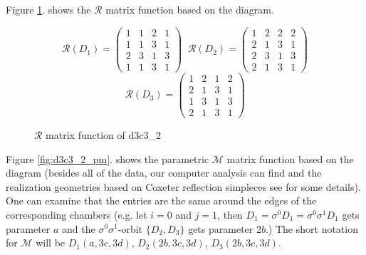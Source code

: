 \documentclass[12pt,a4paper]{article}
\numberwithin{equation}{section}
\theoremstyle{plain}%
\theoremstyle{definition}
\theoremstyle{remark}
\begin{document}
Figure \ref{fig:d3c3_2_r}. shows the $\mathcal{R}$ matrix function based on the
diagram.%

\begin{figure}
  \caption{\label{fig:d3c3_2_r} $\mathcal{R}$ matrix function of d3c3\_2}
  \begin{equation*}
    \mathcal{R}(D_1)=
    \left(
    \begin{array}{cccc}
      1 & 1 & 2 & 1\\
      1 & 1 & 3 & 1\\
      2 & 3 & 1 & 3\\
      1 & 1 & 3 & 1
    \end{array}
    \right)\;\;
    \mathcal{R}(D_2)=
    \left(
    \begin{array}{cccc}
      1 & 2 & 2 & 2\\
      2 & 1 & 3 & 1\\
      2 & 3 & 1 & 3\\
      2 & 1 & 3 & 1
    \end{array}
    \right)
  \end{equation*}
  \begin{equation*}
    \mathcal{R}(D_3)=
    \left(
    \begin{array}{cccc}
      1 & 2 & 1 & 2\\
      2 & 1 & 3 & 1\\
      1 & 3 & 1 & 3\\
      2 & 1 & 3 & 1
    \end{array}
    \right)
  \end{equation*}
\end{figure}

Figure \ref{fig:d3c3_2_pm}. shows the parametric $\mathcal{M}$ matrix function
based on the diagram (besides all of the data, our computer analysis can find
and the realization geometries based on Coxeter reflection simpleces see
\cite{M96} for some details). 
One can examine that the entries are the same around the
edges of the corresponding chambers (e.g. let $i=0$ and $j=1$, then
$D_1=\sigma^0D_1=\sigma^0\sigma^1D_1$ gets parameter $a$ and the
$\sigma^0\sigma^1$-orbit $\{D_2,D_3\}$ gets parameter $2b$.) The short notation
for $\mathcal{M}$ will be $D_1(a,3c,3d)$, $D_2(2b,3c,3d)$, $D_3(2b,3c,3d)$. 
\end{document}
